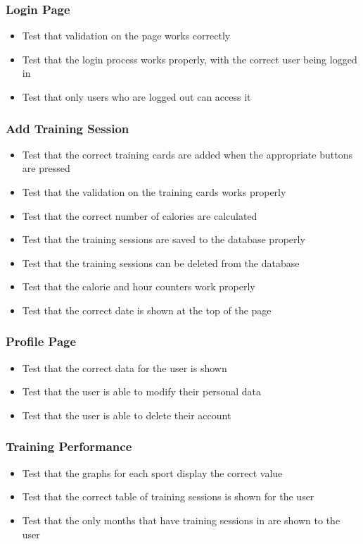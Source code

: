 \documentclass{article}[12pt,a4paper]
\begin{document}
\subsubsection{Login Page}
\begin{itemize}
  \item Test that validation on the page works correctly
  \item Test that the login process works properly, with the correct user being logged in
  \item Test that only users who are logged out can access it
\end{itemize}

\subsubsection{Add Training Session}
\begin{itemize}
  \item Test that the correct training cards are added when the appropriate buttons are pressed
  \item Test that the validation on the training cards works properly
  \item Test that the correct number of calories are calculated
  \item Test that the training sessions are saved to the database properly
  \item Test that the training sessions can be deleted from the database
  \item Test that the calorie and hour counters work properly
  \item Test that the correct date is shown at the top of the page
\end{itemize}

\subsubsection{Profile Page}
\begin{itemize}
  \item Test that the correct data for the user is shown
  \item Test that the user is able to modify their personal data
  \item Test that the user is able to delete their account
\end{itemize}

\subsubsection{Training Performance}
\begin{itemize}
  \item Test that the graphs for each sport display the correct value
  \item Test that the correct table of training sessions is shown for the user
  \item Test that the only months that have training sessions in are shown to the user
\end{itemize}
\end{document}
